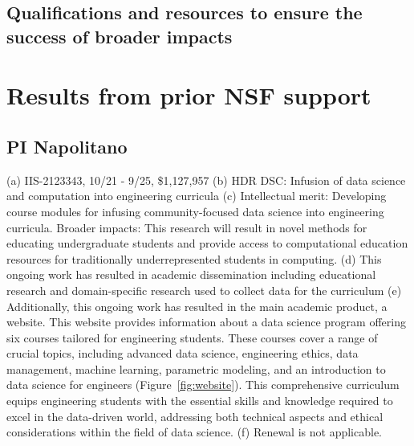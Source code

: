 \documentclass[11pt]{article}
\begin{document}
\subsection{Qualifications and resources to ensure the success of broader impacts}

\section{Results from prior NSF support}  

\subsection{PI Napolitano} (a) IIS-2123343, 10/21 - 9/25, \$1,127,957 (b) HDR DSC: Infusion of data science and computation into engineering curricula (c) Intellectual merit: Developing course modules for infusing community-focused data science into engineering curricula. Broader impacts: This research will result in novel methods for educating undergraduate students and provide access to computational education resources for traditionally underrepresented students in computing. (d) This ongoing work has resulted in academic dissemination including educational research \cite{asdetranslating2023,wfrwnapolitano,rnrncomp} and domain-specific research used to collect data for the curriculum \cite{farnod2022b,
    farnod2023a,
    farnod2022c,
    alam2023a,
    alam2022,
    paulino2021b,
    paulino2022reviver,
    paulino2023automating,
    farnod2022towards,
    paulino2021grammar,
    farnod2023displacement,
    saleem2023analysis,
    alam2023data}
(e) Additionally, this ongoing work has resulted in the main academic product, a website.
This website provides information about a data science program offering six courses tailored for engineering students. These courses cover a range of crucial topics, including advanced data science, engineering ethics, data management, machine learning, parametric modeling, and an introduction to data science for engineers (Figure~\ref{fig:website}). This comprehensive curriculum equips engineering students with the essential skills and knowledge required to excel in the data-driven world, addressing both technical aspects and ethical considerations within the field of data science. (f) Renewal is not applicable. 

\newpage

 
\end{document}
